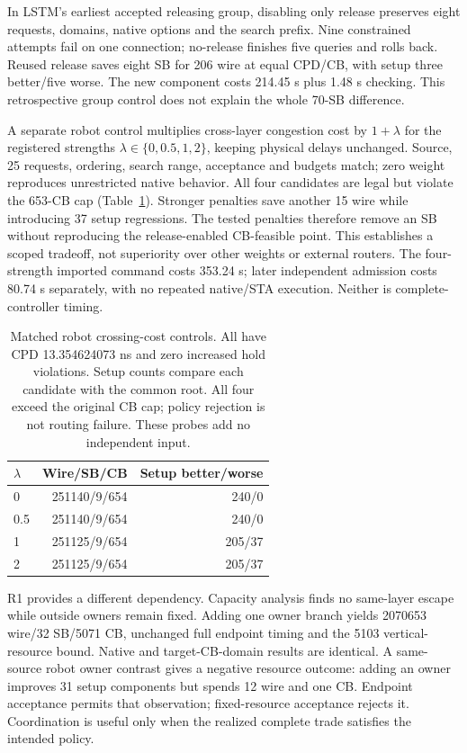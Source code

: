 \documentclass[conference,10pt]{IEEEtran}
\begin{document}
In LSTM's earliest accepted releasing group, disabling only release preserves eight requests, domains, native options and the search prefix. Nine constrained attempts fail on one connection; no-release finishes five queries and rolls back. Reused release saves eight SB for 206 wire at equal CPD/CB, with setup three better/five worse. The new component costs 214.45 s plus 1.48 s checking. This retrospective group control does not explain the whole 70-SB difference.

A separate robot control multiplies cross-layer congestion cost by $1+\lambda$ for the registered strengths $\lambda\in\{0,0.5,1,2\}$, keeping physical delays unchanged. Source, 25 requests, ordering, search range, acceptance and budgets match; zero weight reproduces unrestricted native behavior. All four candidates are legal but violate the 653-CB cap (Table~\ref{tab:costcontrol}). Stronger penalties save another 15 wire while introducing 37 setup regressions. The tested penalties therefore remove an SB without reproducing the release-enabled CB-feasible point. This establishes a scoped tradeoff, not superiority over other weights or external routers. The four-strength imported command costs 353.24 s; later independent admission costs 80.74 s separately, with no repeated native/STA execution. Neither is complete-controller timing.

\begin{table}[t]
\centering\footnotesize\setlength{\tabcolsep}{4pt}
\caption{Matched robot crossing-cost controls. All have CPD 13.354624073 ns and zero increased hold violations. Setup counts compare each candidate with the common root. All four exceed the original CB cap; policy rejection is not routing failure. These probes add no independent input.}
\label{tab:costcontrol}
\begin{tabular}{lrr}\hline
$\lambda$ & Wire/SB/CB & Setup better/worse\\\hline
0 & 251140/9/654 & 240/0\\
0.5 & 251140/9/654 & 240/0\\
1 & 251125/9/654 & 205/37\\
2 & 251125/9/654 & 205/37\\\hline
\end{tabular}
\end{table}

R1 provides a different dependency. Capacity analysis finds no same-layer escape while outside owners remain fixed. Adding one owner branch yields 2070653 wire/32 SB/5071 CB, unchanged full endpoint timing and the 5103 vertical-resource bound. Native and target-CB-domain results are identical. A same-source robot owner contrast gives a negative resource outcome: adding an owner improves 31 setup components but spends 12 wire and one CB. Endpoint acceptance permits that observation; fixed-resource acceptance rejects it. Coordination is useful only when the realized complete trade satisfies the intended policy.
\end{document}
